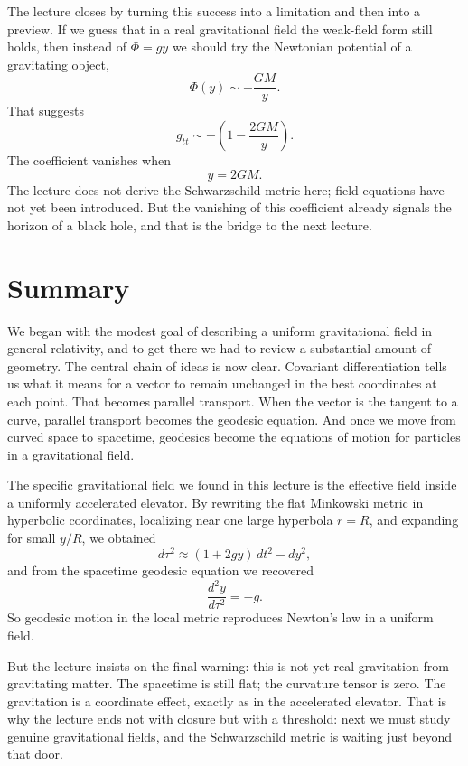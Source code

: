 The lecture closes by turning this success into a limitation and then into a preview. If we guess that in a real gravitational field the weak-field form still holds, then instead of \(\Phi=gy\) we should try the Newtonian potential of a gravitating object,
\begin{equation}
\Phi(y)\sim -\frac{GM}{y}.
\end{equation}
That suggests
\begin{equation}
g_{tt}\sim -\left(1-\frac{2GM}{y}\right).
\end{equation}
The coefficient vanishes when
\begin{equation}
y=2GM.
\end{equation}
The lecture does not derive the Schwarzschild metric here; field equations have not yet been introduced. But the vanishing of this coefficient already signals the horizon of a black hole, and that is the bridge to the next lecture.

\section{Summary}

We began with the modest goal of describing a uniform gravitational field in general relativity, and to get there we had to review a substantial amount of geometry. The central chain of ideas is now clear. Covariant differentiation tells us what it means for a vector to remain unchanged in the best coordinates at each point. That becomes parallel transport. When the vector is the tangent to a curve, parallel transport becomes the geodesic equation. And once we move from curved space to spacetime, geodesics become the equations of motion for particles in a gravitational field.

The specific gravitational field we found in this lecture is the effective field inside a uniformly accelerated elevator. By rewriting the flat Minkowski metric in hyperbolic coordinates, localizing near one large hyperbola \(r=R\), and expanding for small \(y/R\), we obtained
\begin{equation}
d\tau^2\approx (1+2gy)\,dt^2-dy^2,
\end{equation}
and from the spacetime geodesic equation we recovered
\begin{equation}
\frac{d^2y}{d\tau^2}=-g.
\end{equation}
So geodesic motion in the local metric reproduces Newton's law in a uniform field.

But the lecture insists on the final warning: this is not yet real gravitation from gravitating matter. The spacetime is still flat; the curvature tensor is zero. The gravitation is a coordinate effect, exactly as in the accelerated elevator. That is why the lecture ends not with closure but with a threshold: next we must study genuine gravitational fields, and the Schwarzschild metric is waiting just beyond that door.